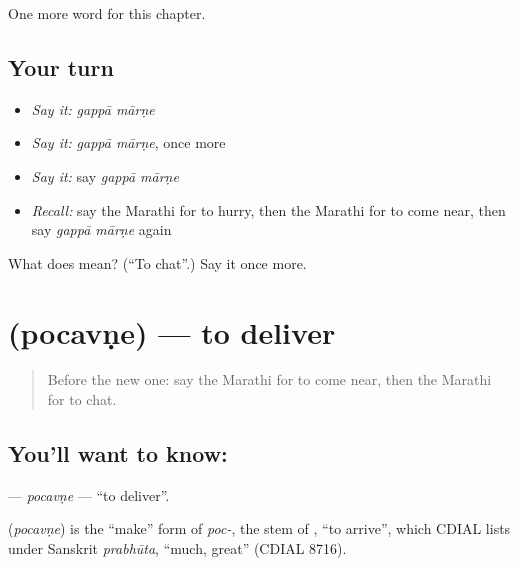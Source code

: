 \begin{grammarlens}[title={What you've built}]
One more word for this chapter.
\end{grammarlens}

\subsection*{Your turn}
\begin{itemize}
\raggedright
  \item \emph{Say it:} \emph{gappā mārṇe}
  \item \emph{Say it:} \emph{gappā mārṇe}, once more
  \item \emph{Say it:} say \emph{gappā mārṇe}
  \item \emph{Recall:} say the Marathi for to hurry, then the Marathi for to come near, then say \emph{gappā mārṇe} again
\end{itemize}

\begin{tcolorbox}[breakable,colback=teal!4,colframe=teal!35!black,title={Before you move on}]
What does   mean? (\textquotedblleft{}To chat\textquotedblright{}.) Say it once more.
\end{tcolorbox}
\section[\texorpdfstring{\mr{पोचवणे} (pocavṇe)}{पोचवणे (pocavṇe)}]{ (pocavṇe) — to deliver}

\label{lesson:MR-C197-pocavne}



\begin{quote}
Before the new one: say the Marathi for to come near, then the Marathi for to chat.
\end{quote}

\subsection*{You'll want to know: }
\textbf{} — \emph{pocavṇe} — \textquotedblleft{}to deliver\textquotedblright{}.

\begin{cousinweb}
\textbf{} (\emph{pocavṇe}) is the \textquotedblleft{}make\textquotedblright{} form of \emph{poc-}, the stem of \textbf{}, \textquotedblleft{}to arrive\textquotedblright{}, which CDIAL lists under Sanskrit \emph{prabhūta}, \textquotedblleft{}much, great\textquotedblright{} (CDIAL 8716).
\end{cousinweb}

